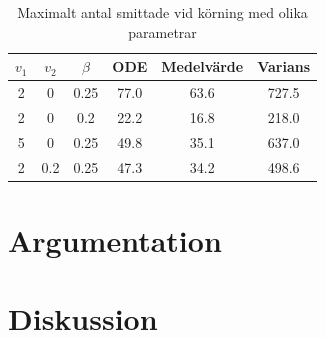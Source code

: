 \documentclass[11pt,a4paper]{article}
\begin{document}
\begin{table}[H]
    \centering
    \caption{Maximalt antal smittade vid körning med olika parametrar}
    \begin{tabular}{c  c c| c | c | c}
        $v_1$ & $v_2$ & $\beta$& ODE & Medelvärde & Varians\\
        \hline
        2 & 0 & 0.25& 77.0 & 63.6 & 727.5\\
        2 & 0 & 0.2& 22.2 & 16.8 & 218.0\\
        5 & 0 & 0.25& 49.8 & 35.1 & 637.0\\
        2 & 0.2 & 0.25& 47.3 & 34.2 & 498.6\\
    \end{tabular}  
\end{table}






\section{Argumentation} %

\section{Diskussion} %
\end{document}
